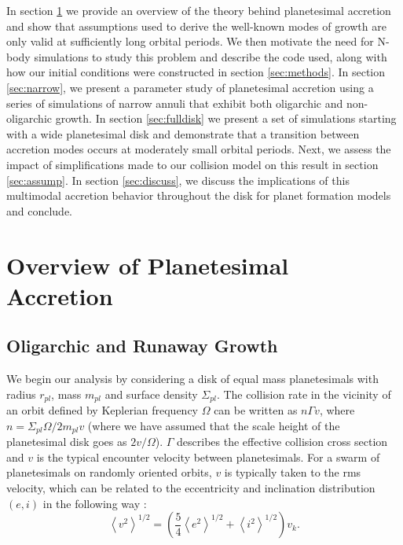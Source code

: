 \documentclass[twocolumn,linenumbers]{aastex63}
\begin{document}
In section \ref{sec:theory} we provide an overview of the theory
behind planetesimal accretion and show that assumptions used to derive
the well-known modes of growth are only valid at sufficiently long
orbital periods. We then motivate the need for N-body simulations to
study this problem and describe the code used, along with how our
initial conditions were constructed in section \ref{sec:methods}. In
section \ref{sec:narrow}, we present a parameter study of planetesimal
accretion using a series of simulations of narrow annuli that exhibit both oligarchic and non-oligarchic growth. In section 
\ref{sec:fulldisk} we present a set of simulations starting with a  wide planetesimal disk and demonstrate that a transition 
between accretion modes occurs at moderately small orbital periods. Next, we assess the impact of 
simplifications made to our collision model on this result in section \ref{sec:assump}. In section \ref{sec:discuss}, we discuss the 
implications of this multimodal accretion behavior throughout the disk for planet formation models and conclude.

\section{Overview of Planetesimal Accretion}\label{sec:theory}

\subsection{Oligarchic and Runaway Growth}

We begin our analysis by considering a disk of equal mass planetesimals
with radius $r_{pl}$, mass $m_{pl}$ and surface density
$\Sigma_{pl}$. The collision rate in the vicinity of an orbit defined
by Keplerian frequency $\Omega$ can be written as $n \Gamma v$, where
$n = \Sigma_{pl} \Omega / 2 m_{pl} v$ (where we have assumed that the scale height of the planetesimal disk goes as $2v/\Omega$). $\Gamma$ describes the effective
collision cross section and $v$ is the typical encounter velocity
between planetesimals.
For a swarm of planetesimals on randomly oriented orbits, $v$ is typically
taken to the rms velocity, which can be related to the eccentricity and inclination distribution $(e, i)$ in the following way \citep{lissauer93}:
\begin{equation}\label{eq:ecc_vel}
	\left< v^{2} \right>^{1/2} = \left( \frac{5}{4} \left< e^{2} \right>^{1/2} + \left< i^{2} \right>^{1/2}  \right) v_{k}.
\end{equation}
\end{document}
